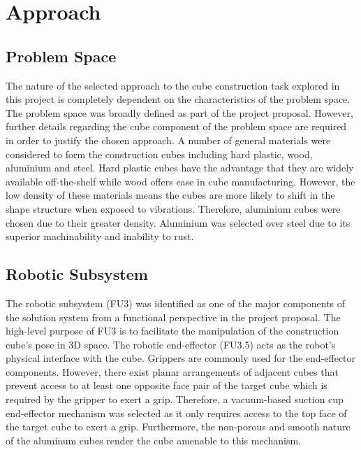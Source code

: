 
\section{Approach}

\subsection{Problem Space}

The nature of the selected approach to the cube construction task explored in this project is completely dependent on the characteristics of the problem space. The problem space was broadly defined as part of the project proposal. However, further details regarding the cube component of the problem space are required in order to justify the chosen approach. A number of general materials were considered to form the construction cubes including hard plastic, wood, aluminium and steel. Hard plastic cubes have the advantage that they are widely available off-the-shelf while wood offers ease in cube manufacturing. However, the low density of these materials means the cubes are more likely to shift in the shape structure when exposed to vibrations. Therefore, aluminium cubes were chosen due to their greater density. Aluminium was selected over steel due to its superior machinability and inability to rust.

\subsection{Robotic Subsystem}

The robotic subsystem (FU3) was identified as one of the major components of the solution system from a functional perspective in the project proposal. The high-level purpose of FU3 is to facilitate the manipulation of the construction cube's pose in 3D space. The robotic end-effector (FU3.5) acts as the robot's physical interface with the cube. Grippers are commonly used for the end-effector components. However, there exist planar arrangements of adjacent cubes that prevent access to at least one opposite face pair of the target cube which is required by the gripper to exert a grip. Therefore, a vacuum-based suction cup end-effector mechanism was selected as it only requires access to the top face of the target cube to exert a grip. Furthermore, the non-porous and smooth nature of the aluminum cubes render the cube amenable to this mechanism.

